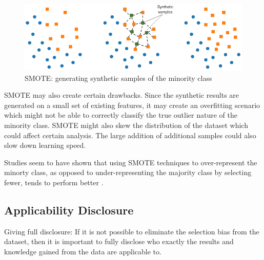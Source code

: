 	\begin{figure}
	\centering
  		\includegraphics[width=0.88\linewidth]{graphics/sample_selection_bias/Smote.png}
  		\caption{SMOTE: generating synthetic samples of the minority class}
  		\label{fig:correlation}
	\end{figure}
	
	SMOTE may also create certain drawbacks. Since the synthetic results are generated on a small set of existing features, it may create an overfitting scenario which might not be able to correctly classify the true outlier nature of the minority class.
	SMOTE might also skew the distribution of the dataset which could affect certain analysis. The large addition of additional samples could also slow down learning speed.\citep{Weiss2007}
	
Studies seem to have shown that using SMOTE techniques to over-represent the minorty class, as opposed to under-representing the majority class by selecting fewer, tends to perform better \citep{ChawlaEtAl2002}. 


	\subsection{Applicability Disclosure}
	
	Giving full disclosure: If it is not possible to eliminate the selection bias from the dataset, then it is important to fully disclose who exactly the results and knowledge gained from the data are applicable to.

